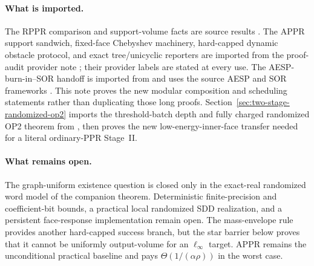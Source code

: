 \paragraph{What is imported.}
The RPPR comparison and support-volume facts are source results
\citep{fountoulakis2026complexity}.  The APPR support sandwich, fixed-face
Chebyshev machinery, hard-capped dynamic obstacle protocol, and exact
tree/unicyclic reporters are imported
from the proof-audit provider note ; their provider
labels are stated at every use.  The AESP-burn-in--SOR handoff is imported
from  and uses the source AESP and SOR frameworks
\citep{huang2025accelerated,chen2023accelerating}.  This note proves the new
modular composition and scheduling statements rather than duplicating those
long proofs.  Section~\ref{sec:two-stage-randomized-op2} imports the
threshold-batch depth and fully charged randomized OP2 theorem from
, then proves the new low-energy-inner-face transfer
needed for a literal ordinary-PPR Stage~II.

\paragraph{What remains open.}
The graph-uniform existence question is closed only in the exact-real
randomized word model of the companion theorem.  Deterministic
finite-precision and coefficient-bit bounds, a practical local randomized
SDD realization, and a persistent face-response implementation remain open.
The mass-envelope rule provides another hard-capped success branch, but the
star barrier below proves that it cannot be uniformly output-volume for an
$\ell_\infty$ target.  APPR remains the unconditional practical baseline and
pays $\Theta(1/(\alpha\rho))$ in the worst case.
